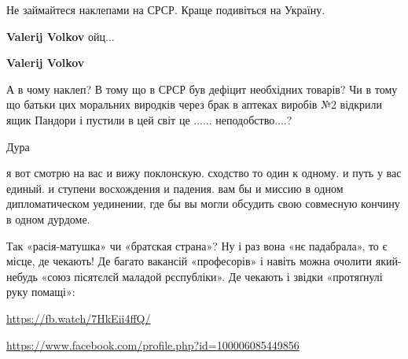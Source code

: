 \begin{itemize}
\begin{itemize}
Не займайтеся наклепами на СРСР.
Краще подивіться на Україну.

 
\textbf{Valerij Volkov} ойц...

 
\textbf{Valerij Volkov} 

А в чому наклеп? В тому що в СРСР був дефіцит необхідних
товарів? Чи в тому що батьки цих моральних виродків через брак в аптеках виробів
№2 відкрили ящик Пандори і пустили в цей світ це ...... неподобство....?


 
Дура
\end{itemize}


я вот смотрю на вас и вижу поклонскую. сходство то один к одному. и путь у вас
единый. и ступени восхождения и падения. вам бы и миссию в одном
дипломатическом уединении, где бы вы могли обсудить свою совмесную кончину в
одном дурдоме.


Так «расія-матушка» чи «братская страна»? Ну і раз вона «нє падабрала», то є
місце, де чекають! Де багато вакансій «професорів» і навіть можна очолити
який-небудь «союз пісятєлєй маладой рєспубліки». Де чекають і звідки
«протяґнулі руку помащі»:

\url{https://fb.watch/7HkEii4ffQ/}

\url{https://www.facebook.com/profile.php?id=100006085449856}\par
 

\end{itemize}
